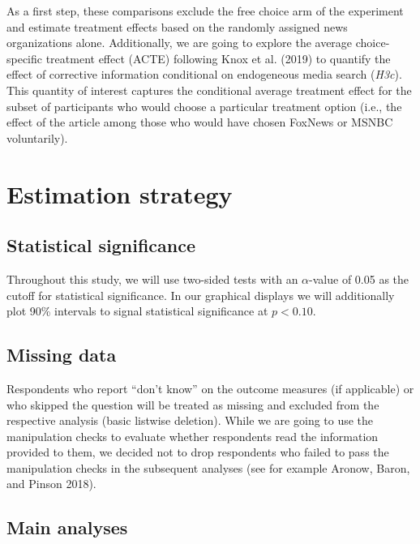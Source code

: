 \documentclass[]{article}
\begin{document}
As a first step, these comparisons exclude the free choice arm of the
experiment and estimate treatment effects based on the randomly assigned
news organizations alone. Additionally, we are going to explore the
average choice-specific treatment effect (ACTE) following Knox et al.
(2019) to quantify the effect of corrective information conditional on
endogeneous media search (\emph{H3c}). This quantity of interest
captures the conditional average treatment effect for the subset of
participants who would choose a particular treatment option (i.e., the
effect of the article among those who would have chosen FoxNews or MSNBC
voluntarily).

\hypertarget{estimation-strategy}{%
\section{Estimation strategy}\label{estimation-strategy}}

\hypertarget{statistical-significance}{%
\subsection{Statistical significance}\label{statistical-significance}}

Throughout this study, we will use two-sided tests with an
\(\alpha\)-value of 0.05 as the cutoff for statistical significance. In
our graphical displays we will additionally plot 90\% intervals to
signal statistical significance at \(p<0.10\).

\hypertarget{missing-data}{%
\subsection{Missing data}\label{missing-data}}

Respondents who report ``don't know'' on the outcome measures (if
applicable) or who skipped the question will be treated as missing and
excluded from the respective analysis (basic listwise deletion). While
we are going to use the manipulation checks to evaluate whether
respondents read the information provided to them, we decided not to
drop respondents who failed to pass the manipulation checks in the
subsequent analyses (see for example Aronow, Baron, and Pinson 2018).

\hypertarget{main-analyses}{%
\subsection{Main analyses}\label{main-analyses}}
\end{document}

